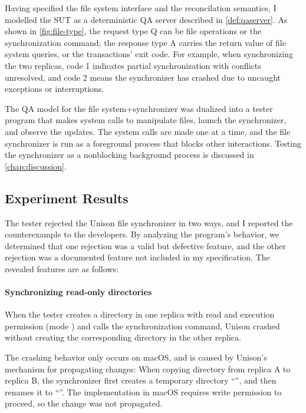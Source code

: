 Having specified the file system interface and the reconcilation semantics, I
modelled the SUT as a deterministic QA server described in
\autoref{def:qaserver}.  As shown in \autoref{fig:file-type}, the request type
\ilc Q can be file operations or the synchronization command; the response type
\ilc A carries the return value of file system queries, or the transactions'
exit code.  For example, when synchronizing the two replicas, code 1 indicates
partial synchronization with conflicts unresolved, and code 2 means the
synchronizer has crashed due to uncaught exceptions or interruptions.

The QA model for the file system+synchronizer was dualized into a tester program
that makes system calls to manipulate files, launch the synchronizer, and
observe the updates.  The system calls are made one at a time, and the file
synchronizer is run as a foreground process that blocks other interactions.
Testing the synchronizer as a nonblocking background process is discussed in
\autoref{chap:discussion}.

\subsection{Experiment Results}
\label{sec:file-result}
The tester rejected the Unison file synchronizer in two ways, and I reported
the counterexample to the developers.  By analyzing the program's behavior, we
determined that one rejection was a valid but defective feature, and the other
rejection was a documented feature not included in my specification.  The
revealed features are as follows:

\paragraph{Synchronizing read-only directories}
When the tester creates a directory in one replica with read and execution
permission (mode ) and calls the synchronization command, Unison
crashed without creating the corresponding directory in the other replica.

The crashing behavior only occurs on macOS, and is caused by Unison's mechanism
for propagating changes: When copying directory  from replica \ilj A to
replica \ilj B, the synchronizer first creates a temporary directory
``'', and then renames it to ``''.
The  implementation in macOS requires write permission to
proceed, so the change was not propagated.

